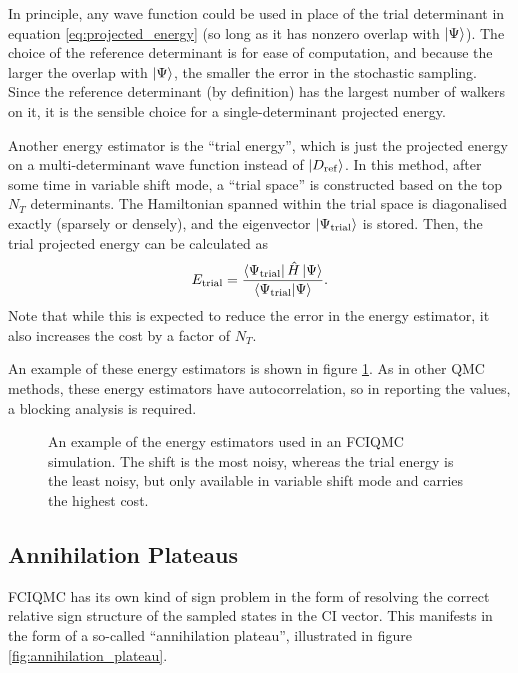 In principle, any wave function could be used in place of the trial determinant in equation \ref{eq:projected_energy} (so long as it has nonzero overlap with $\ket\Psi$). The choice of the reference determinant is for ease of computation, and because the larger the overlap with $\ket\Psi$, the smaller the error in the stochastic sampling. Since the reference determinant (by definition) has the largest number of walkers on it, it is the sensible choice for a single-determinant projected energy.

Another energy estimator is the ``trial energy'', which is just the projected energy on a multi-determinant wave function instead of $\ket{D_\mathrm{ref}}$. In this method, after some time in variable shift mode, a ``trial space'' is constructed based on the top $N_T$ determinants. The Hamiltonian spanned within the trial space is diagonalised exactly (sparsely or densely), and the eigenvector $\ket{\Psi_\mathrm{trial}}$ is stored. Then, the trial projected energy can be calculated as
\begin{equation}
    E_\mathrm{trial} = \frac{\bra{\Psi_\mathrm{trial}}\hat H\ket{\Psi}}{\braket{\Psi_\mathrm{trial}}{\Psi}}.
\end{equation}
Note that while this is expected to reduce the error in the energy estimator, it also increases the cost by a factor of $N_T$.

An example of these energy estimators is shown in figure \ref{fig:fciqmc_energy_estimators}. As in other \gls{QMC} methods, these energy estimators have autocorrelation, so in reporting the values, a blocking analysis is required.

\begin{figure}[htbp]
    \centering
    \caption{An example of the energy estimators used in an FCIQMC simulation. The shift is the most noisy, whereas the trial energy is the least noisy, but only available in variable shift mode and carries the highest cost. }
    \label{fig:fciqmc_energy_estimators}
\end{figure}

\subsection{Annihilation Plateaus}

\gls{FCIQMC} has its own kind of sign problem in the form of resolving the correct relative sign structure of the sampled states in the \gls{CI} vector. This manifests in the form of a so-called ``annihilation plateau'', illustrated in figure \ref{fig:annihilation_plateau}.


